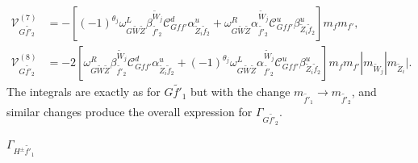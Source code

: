 \documentclass[final,3p,times,pdflatex]{elsarticle}
\begin{document}
\begin{align}
\mathcal{V}_{G \tilde{f'}_2}^{(7)} &= -[(-1)^{\theta_j}\omega_{G \tilde{W} \tilde{Z}}^L \beta_{\tilde{f'}_2}^{\tilde{W}_j} \mathcal{C}_{G f f'}^d \alpha_{\tilde{Z}_i \tilde{f}_2}^{u} + \omega_{G \tilde{W} \tilde{Z}}^R \alpha_{\tilde{f'}_2}^{\tilde{W}_j} \mathcal{C}_{G f f'}^u \beta_{\tilde{Z}_i \tilde{f}_2}^{u}]m_{f}m_{f'}, \\
\mathcal{V}_{G \tilde{f'}_2}^{(8)} &= -2[\omega_{G \tilde{W} \tilde{Z}}^R \beta_{\tilde{f'}_2}^{\tilde{W}_j} \mathcal{C}_{G f f'}^d \alpha_{\tilde{Z}_i \tilde{f}_2}^{u} + (-1)^{\theta_j}\omega_{G \tilde{W} \tilde{Z}}^L \alpha_{\tilde{f'}_2}^{\tilde{W}_j} \mathcal{C}_{G f f'}^u \beta_{\tilde{Z}_i \tilde{f}_2}^{u}]m_{f}m_{f'}|m_{\tilde{W}_j}|m_{\tilde{Z}_i}|.
\end{align}
The integrals are exactly as for $G \tilde{f'}_1$ but with the change $m_{\tilde{f'}_1} \rightarrow m_{\tilde{f'}_2}$, and similar changes produce the overall expression for $\Gamma_{G \tilde{f'}_2}$.

\textbf{\underline{$\Gamma_{H^{\pm} \tilde{f'}_1}$}}
\end{document}
